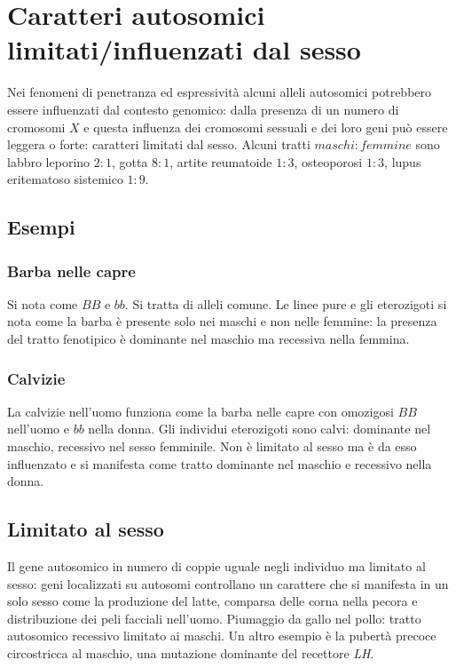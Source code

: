 \section{Caratteri autosomici limitati/influenzati dal sesso}
Nei fenomeni di penetranza ed espressivit\`a alcuni alleli autosomici potrebbero essere influenzati dal contesto genomico: dalla presenza di un numero di cromosomi $X$ e questa 
influenza dei cromosomi sessuali e dei loro geni pu\`o essere leggera o forte: caratteri limitati dal sesso. Alcuni tratti $maschi:femmine$ sono labbro leporino $2:1$, gotta $8:1$, 
artite reumatoide $1:3$, osteoporosi $1:3$, lupus eritematoso sistemico $1:9$. 
\subsection{Esempi}
\subsubsection{Barba nelle capre}
Si nota come $BB$ e $bb$. Si tratta di alleli comune. Le linee pure e gli eterozigoti si nota come la barba \`e presente solo nei maschi e non nelle femmine: la presenza del tratto 
fenotipico \`e dominante nel maschio ma recessiva nella femmina. 
\subsubsection{Calvizie}
La calvizie  nell'uomo funziona come la barba nelle capre con omozigosi $BB$ nell'uomo e $bb$ nella donna. Gli individui eterozigoti sono calvi: dominante nel maschio, recessivo nel
sesso femminile. Non \`e limitato al sesso ma \`e da esso influenzato e si manifesta come tratto dominante nel maschio e recessivo nella donna.
\subsection{Limitato al sesso}
Il gene autosomico in numero di coppie uguale negli individuo ma limitato al sesso: geni localizzati su autosomi controllano un carattere che si manifesta in un solo sesso come la
produzione del latte, comparsa delle corna nella pecora e distribuzione dei peli facciali nell'uomo. Piumaggio da gallo nel pollo: tratto autosomico recessivo limitato ai maschi. Un
altro esempio \`e la pubert\`a precoce circostricca al maschio, una mutazione dominante del recettore \emph{LH}. 
